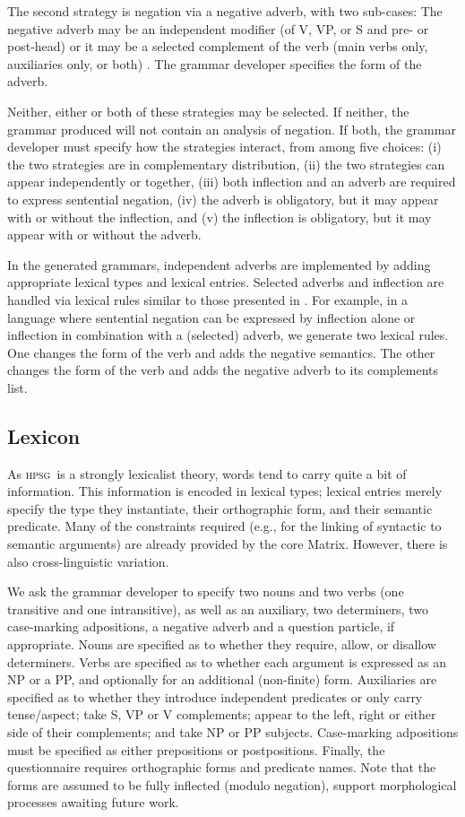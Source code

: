 \documentclass[11pt]{article}
\newcommand{\hpsg}{\textsc{hpsg}}
\begin{document}
The second strategy is negation via a negative adverb, with two
sub-cases: The negative adverb may be an independent modifier (of V,
VP, or S and pre- or post-head) or it may be a
selected complement of the verb (main verbs only, auxiliaries only, or
both) \cite{Kim00}.  The grammar developer specifies the form of the adverb.

Neither, either or both of these strategies may be selected.
If neither, the grammar
produced will not contain an analysis of negation.  If both,
the grammar developer must specify how the strategies
interact, from among five choices:
(i) the two strategies are in complementary distribution, (ii) the two
strategies can appear independently or together, (iii) both inflection
and an adverb are required to express sentential negation, (iv) the
adverb is obligatory, but it may appear with or without the
inflection, and (v) the inflection is obligatory, but it may appear
with or without the adverb.

In the generated grammars, independent adverbs are implemented by
adding appropriate lexical types and lexical entries.  Selected
adverbs and inflection are handled via lexical rules similar to those
presented in \cite{Sag:Was:Ben:03}.  For example, in a language where
sentential negation can be expressed by inflection alone or inflection
in combination with a (selected) adverb, we generate two lexical
rules.  One changes the form of the verb and adds the negative
semantics.  The other changes the form of the verb and adds the
negative adverb to its complements list.

\subsection{Lexicon}

As \hpsg\ is a strongly lexicalist theory, words
tend to carry quite a bit of information.  This information is encoded
in lexical types; lexical entries merely specify
the type they instantiate, their orthographic form, and their semantic
predicate.  Many of the constraints required (e.g., for the linking of
syntactic to semantic arguments) are already provided by the core
Matrix.  However, there is also cross-linguistic variation.

We ask the grammar developer to specify two nouns and two verbs (one
transitive and one intransitive), as well as an auxiliary, two
determiners, two case-marking adpositions, a negative adverb and a
question particle, if appropriate.  Nouns are specified as to whether
they require, allow, or disallow determiners.  Verbs are specified as
to whether each argument is expressed as an NP or a PP, and optionally
for an additional (non-finite) form.  Auxiliaries are specified as
to whether they introduce independent predicates or only carry
tense/aspect; take S, VP or V complements; appear to the left, right
or either side of their complements; and take NP or PP subjects.
Case-marking adpositions must be specified as either prepositions or
postpositions.  Finally, the questionnaire requires orthographic
forms and predicate names.  Note that the forms are assumed to be
fully inflected (modulo negation), support
morphological processes awaiting future work.
\end{document}

